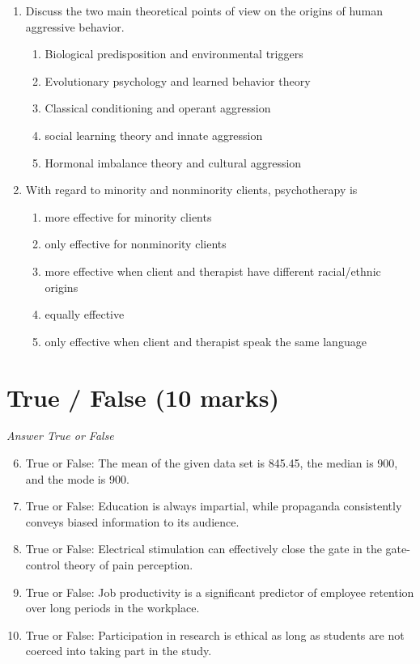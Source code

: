 \documentclass[12pt]{article}
\begin{document}
\begin{enumerate}[label=\arabic*.]
\begin{enumerate}[label=(\alph*)]
    \item Experimental phase, social use phase, intensive use phase, compulsive use phase
    \item Initial phase, middle phase, crucial phase, termination phase
\end{enumerate}
\item Discuss the two main theoretical points of view on the origins of human aggressive behavior.
\begin{enumerate}[label=(\alph*)]
    \item Biological predisposition and environmental triggers
    \item Evolutionary psychology and learned behavior theory
    \item Classical conditioning and operant aggression
    \item social learning theory and innate aggression
    \item Hormonal imbalance theory and cultural aggression
\end{enumerate}
\item With regard to minority and nonminority clients, psychotherapy is
\begin{enumerate}[label=(\alph*)]
    \item more effective for minority clients
    \item only effective for nonminority clients
    \item more effective when client and therapist have different racial/ethnic origins
    \item equally effective
    \item only effective when client and therapist speak the same language
\end{enumerate}
\end{enumerate}

\section*{True / False (10 marks)}
\textit{Answer True or False}
\begin{enumerate}[label=\arabic*.]
\setcounter{enumi}{5}
\item True or False: The mean of the given data set is 845.45, the median is 900, and the mode is 900.
\item True or False: Education is always impartial, while propaganda consistently conveys biased information to its audience.
\item True or False: Electrical stimulation can effectively close the gate in the gate-control theory of pain perception.
\item True or False: Job productivity is a significant predictor of employee retention over long periods in the workplace.
\item True or False: Participation in research is ethical as long as students are not coerced into taking part in the study.
\end{enumerate}
\end{document}
